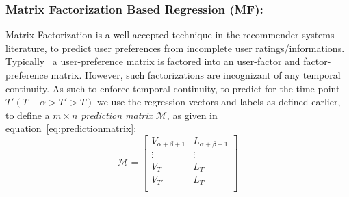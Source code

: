 \subsubsection{\label{sec:model:matrixfactor} Matrix Factorization Based Regression (MF):}
Matrix Factorization is a well accepted technique in
the recommender systems literature, to predict user 
preferences from incomplete user ratings/informations. Typically~\cite{canny2002factor}
a user-preference matrix is factored into an user-factor and
factor-preference matrix. However, such factorizations are incognizant of any 
temporal continuity. As such to enforce temporal continuity, to predict for the time point 
$T' (T +\alpha > T' > T)$ we use the regression vectors 
and labels as defined earlier, %
to define a $m \times n$ {\it prediction
matrix} $\mathcal{M}$, as given in equation~\ref{eq:predictionmatrix}:
\vspace{-1em}
\begin{equation}
  \label{eq:predictionmatrix}
\mathcal{M} = \left[\begin{array}{ll}
              V_{\alpha + \beta + 1} & L_{\alpha+\beta + 1} \\
                              \vdots & \vdots \\
                               V_{T} & L_T \\
                               V_{T'} & L_{T'} \\ 
    \end{array}
  \right]
\end{equation}

